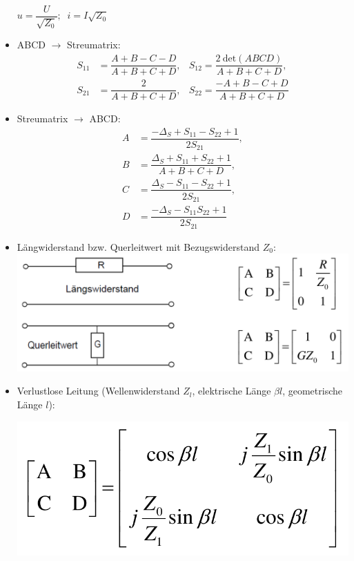 \begin{itemize}
            \(u = \dfrac{U}{\sqrt{Z_0}}; \;\; i = I\sqrt{Z_0}\)
        \item ABCD $\to$ Streumatrix:
            \begin{align*}
                S_{11} &= \dfrac{A+B-C-D}{A+B+C+D}, &S_{12} = \dfrac{2\:\mathrm{det}(ABCD)}{A+B+C+D},\\
                S_{21} &= \dfrac{2}{A+B+C+D}, &S_{22} = \dfrac{-A+B-C+D}{A+B+C+D}
            \end{align*}
        \item Streumatrix $\to$ ABCD:
            \begin{align*}
                A &= \dfrac{-\Delta_S + S_{11} - S_{22} + 1}{2 S_{21}},\\
                B &= \dfrac{\Delta_S + S_{11} + S_{22} + 1}{A+B+C+D},\\
                C &= \dfrac{\Delta_S - S_{11} - S_{22} + 1}{2 S_{21}},\\
                D &= \dfrac{-\Delta_S - S_{11} S_{22} + 1}{2 S_{21}}
            \end{align*}
        \item Längwiderstand bzw. Querleitwert mit Bezugswiderstand $Z_0$:
            \includegraphics[width=0.35\paperheight]{content/fuw/pictures/fuw_kettenmatrix_widerstand_leitwert.png}
        \item Verlustlose Leitung (Wellenwiderstand $Z_l$, elektrische Länge $\beta l$, geometrische Länge $l$):
            \begin{center}
                \includegraphics[width=0.25\paperheight]{content/fuw/pictures/fuw_kettenmatrix_leitung.png}
            \end{center}
\end{itemize}
